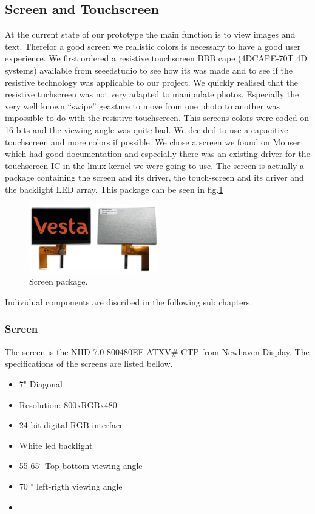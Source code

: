 \subsection{Screen and Touchscreen}
At the current state of our prototype the main function is to view images and text. Therefor a good screen we realistic colors is necessary to have a good user experience.
We first ordered a resistive touchscreen BBB cape (4DCAPE-70T 4D systems) available from seeedstudio to see how its was made and to see if the resistive technology was applicable to our project. We quickly realised that the resistive tuchscreen was not very adapted to manipulate photos. Especially the very well known “swipe” geasture to move from one photo to another was impossible to do with the resistive touchscreen.
This screens colors were coded on 16 bits and the viewing angle was quite bad. We decided to use a capacitive touchscreen and more colors if possible. We chose a screen we found on Mouser which had good documentation and especially there was an existing driver for the touchscreen IC in the linux kernel we were going to use.
 The screen is actually a package containing the screen and its driver, the touch-screen and its driver and the backlight LED array. This package can be seen in fig.\ref{fig:screen package}

 \begin{figure}[!htb]
     \centering
     \includegraphics[width=0.5\textwidth,keepaspectratio]{chap/hardfig/newhaven_screen_image}
     \caption{Screen package.}
     \label{fig:screen package}
 \end{figure}

 Individual components are discribed in the following sub chapters.

\subsubsection{Screen}
The screen is the NHD-7.0-800480EF-ATXV\#-CTP from Newhaven Display. The specifications of the screens are listed bellow.
\begin{itemize}
  \item {7" Diagonal}
  \item{Resolution: 800xRGBx480}
  \item{24 bit digital RGB interface}
  \item{White led backlight}
  \item{55-65$^{\circ}$ Top-bottom viewing angle }
  \item{70 $^{\circ}$ left-rigth viewing angle}
  \item{}
\end{itemize}


